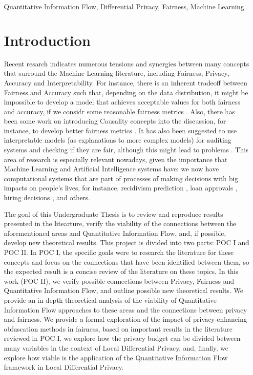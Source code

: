 \documentclass[conference]{IEEEtran}
\begin{document}
\begin{IEEEkeywords}
Quantitative Information Flow, Differential Privacy, Fairness, Machine Learning.
\end{IEEEkeywords}




\section{Introduction}
Recent resarch \cite{Sok}\cite{Reductions}\cite{Rachel}\cite{Awareness} indicates numerous tensions and synergies between many concepts that surround the Machine Learning literature, including Fairness, Privacy, Accuracy and Interpretability. For instance, there is an inherent tradeoff between Fairness and Accuracy such that, depending on the data distribution, it might be impossible to develop a model that achieves acceptable values for both fairness and accuracy, if we considr some reasonable fairness metrics \cite{Carlos}. Also, there has been some work on introducing Causality concepts into the discussion, for instance, to develop better fairness metrics \cite{CausalFair}. It has also been suggested to use interpretable models (as explanations to more complex models) for auditing systems and checking if they are fair, although this might lead to problems \cite{ExplainAll}. This area of research is especially relevant nowadays, given the importance that Machine Learning and Artificial Intelligence systems have: we now have computational systems that are part of processes of making decisions with big impacts on people's lives, for instance, recidivism prediction \cite{Compass}, loan approvals \cite{Loans}, hiring decisions \cite{Jobs}, and others.

The goal of this Undergraduate Thesis is to review and reproduce results presented in the litearture, verify the viability of the connections between the aforementioned areas and Quantitative Information Flow, and, if possible, develop new theoretical results. This project is divided into two parts: POC I and POC II. In POC I, the specific goals were to research the literature for these concepts and focus on the connections that have been identified between them, so the expected result is a concise review of the literature on these topics. In this work (POC II), we verify possible connections between Privacy, Fairness and Quantitative Information Flow, and outline possible new theoretical results. We provide an in-depth theoretical analysis of the viability of Quantitative Information Flow approaches to these areas and the connections between privacy and fairness. We provide a formal exploration of the impact of privacy-enhancing obfuscation methods in fairness, based on important results in the literature reviewed in POC I, we explore how the privacy budget can be divided between many variables in the context of Local Differential Privacy, and, finally, we explore how viable is the application of the Quantitative Information Flow framework in Local Differential Privacy.
\end{document}
